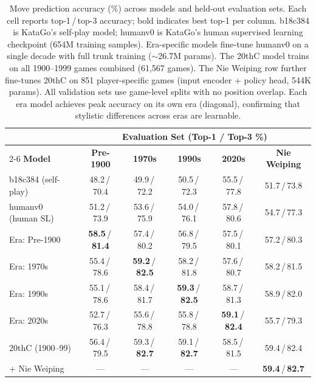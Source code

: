 \documentclass{article}
\begin{document}
\begin{table}[t]
\centering
\footnotesize
\setlength{\tabcolsep}{4.5pt}
\begin{tabular}{@{}l c c c c c@{}}
\toprule
& \multicolumn{5}{c}{\textbf{Evaluation Set (Top-1 / Top-3 \%)}} \\
\cmidrule(l){2-6}
\textbf{Model} & \textbf{Pre-1900} & \textbf{1970s} & \textbf{1990s} & \textbf{2020s} & \textbf{Nie Weiping} \\
\midrule
b18c384 (self-play)  & 48.2\,/\,70.4 & 49.9\,/\,72.2 & 50.5\,/\,72.3 & 55.5\,/\,77.8 & 51.7\,/\,73.8 \\
humanv0 (human SL)   & 51.2\,/\,73.9 & 53.6\,/\,75.9 & 54.0\,/\,76.1 & 57.8\,/\,80.6 & 54.7\,/\,77.3 \\
\midrule
Era: Pre-1900   & \textbf{58.5}\,/\,\textbf{81.4} & 57.4\,/\,80.2 & 56.8\,/\,79.5 & 57.5\,/\,80.1 & 57.2\,/\,80.3 \\
Era: 1970s      & 55.4\,/\,78.6 & \textbf{59.2}\,/\,\textbf{82.5} & 58.2\,/\,81.8 & 57.6\,/\,80.7 & 58.2\,/\,81.5 \\
Era: 1990s      & 55.1\,/\,78.6 & 58.4\,/\,81.7 & \textbf{59.3}\,/\,\textbf{82.5} & 58.7\,/\,81.3 & 58.9\,/\,82.0 \\
Era: 2020s      & 52.7\,/\,76.3 & 55.6\,/\,78.8 & 55.8\,/\,78.8 & \textbf{59.1}\,/\,\textbf{82.4} & 55.7\,/\,79.3 \\
\midrule
20thC (1900--99) & 56.4\,/\,79.5 & 59.3\,/\,\textbf{82.7} & 59.1\,/\,\textbf{82.7} & 58.5\,/\,81.5 & 59.4\,/\,82.4 \\
+ Nie Weiping   & ---  & ---  & ---  & ---  & \textbf{59.4}\,/\,\textbf{82.7} \\
\bottomrule
\end{tabular}
\caption{Move prediction accuracy (\%) across models and held-out evaluation sets. Each cell reports top-1\,/\,top-3 accuracy; bold indicates best top-1 per column. b18c384 is KataGo's self-play model; humanv0 is KataGo's human supervised learning checkpoint (654M training samples). Era-specific models fine-tune humanv0 on a single decade with full trunk training (${\sim}$26.7M params). The 20thC model trains on all 1900--1999 games combined (61,567 games). The Nie Weiping row further fine-tunes 20thC on 851 player-specific games (input encoder + policy head, 544K params). All validation sets use game-level splits with no position overlap. Each era model achieves peak accuracy on its own era (diagonal), confirming that stylistic differences across eras are learnable.}
\label{tab:main_results}
\end{table}
\end{document}
